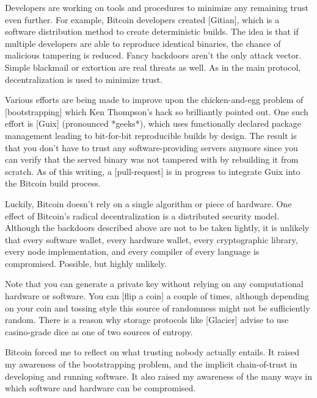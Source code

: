 {{Developers are working on tools and procedures to minimize any remaining
trust even further. For example, Bitcoin developers created [Gitian],
which is a software distribution method to create deterministic builds.
The idea is that if multiple developers are able to reproduce identical
binaries, the chance of malicious tampering is reduced. Fancy backdoors
aren't the only attack vector. Simple blackmail or extortion are real
threats as well. As in the main protocol, decentralization is used to
minimize trust.

Various efforts are being made to improve upon the chicken-and-egg
problem of [bootstrapping] which Ken Thompson's hack so brilliantly
pointed out. One such effort is [Guix] (pronounced *geeks*), which uses
functionally declared package management leading to bit-for-bit
reproducible builds by design. The result is that you don't have to
trust any software-providing servers anymore since you can verify that
the served binary was not tampered with by rebuilding it from scratch.
As of this writing, a [pull-request] is in progress to integrate Guix
into the Bitcoin build process.

{%

Luckily, Bitcoin doesn't rely on a single algorithm or piece of
hardware. One effect of Bitcoin's radical decentralization is a
distributed security model. Although the backdoors described above are
not to be taken lightly, it is unlikely that every software wallet,
every hardware wallet, every cryptographic library, every node
implementation, and every compiler of every language is compromised.
Possible, but highly unlikely.

Note that you can generate a private key without relying on any
computational hardware or software. You can [flip a coin] a couple of
times, although depending on your coin and tossing style this source of
randomness might not be sufficiently random. There is a reason why
storage protocols like [Glacier] advise to use casino-grade dice as one
of two sources of entropy.

Bitcoin forced me to reflect on what trusting nobody actually entails.
It raised my awareness of the bootstrapping problem, and the implicit
chain-of-trust in developing and running software. It also raised my
awareness of the many ways in which software and hardware can be
compromised.

}}}
